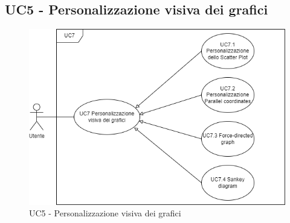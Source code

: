 \newpage


\subsection{UC5 - Personalizzazione visiva dei grafici}
\begin{figure}[h!]
	\centering
	\includegraphics[scale=0.55]{../../assets/personalizzazioneVisivaGrafici.drawio.png}
	\caption{UC5 - Personalizzazione visiva dei grafici}
\end{figure}
